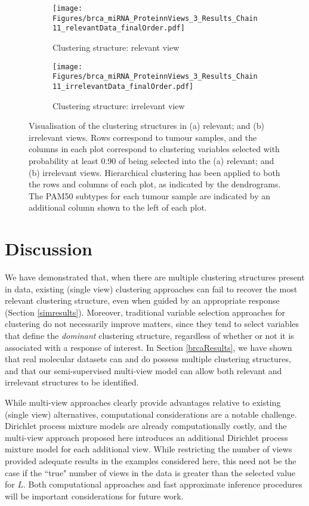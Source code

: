 \documentclass[12pt]{article}
\begin{document}
\begin{figure}[!ht]\centering
    \begin{subfigure}[b]{0.49\textwidth}\centering
\texttt{[image: Figures/brca\_miRNA\_ProteinnViews\_3\_Results\_Chain11\_relevantData\_finalOrder.pdf]}
\caption{Clustering structure: relevant view}
    \end{subfigure}
    \begin{subfigure}[b]{0.49\textwidth}\centering
\texttt{[image: Figures/brca\_miRNA\_ProteinnViews\_3\_Results\_Chain11\_irrelevantData\_finalOrder.pdf]}
\caption{Clustering structure: irrelevant view}
    \end{subfigure}\caption{Visualisation of the clustering structures in (a) relevant; and (b) irrelevant views.  Rows correspond to tumour samples, and the columns in each plot correspond to clustering variables selected with probability at least 0.90 of being selected into the (a) relevant; and (b) irrelevant views.  Hierarchical clustering has been applied to both the rows and columns of each plot, as indicated by the dendrograms.  The PAM50 subtypes for each tumour sample are indicated by an additional column shown to the left of each plot.  }\label{mv}
\end{figure}

\section{Discussion}
We have demonstrated that, when there are multiple clustering structures present in data, existing (single view) clustering approaches can fail to recover the most relevant clustering structure, even when guided by an appropriate response (Section \ref{simresults}).  Moreover, traditional variable selection approaches for clustering do not necessarily improve matters, since they tend to select variables that define the {\em dominant} clustering structure, regardless of whether or not it is associated with a response of interest.  In Section \ref{brcaResults}, we have shown that real molecular datasets can and do possess multiple clustering structures, and that our semi-supervised multi-view model can allow both relevant and irrelevant structures to be identified.

While multi-view approaches clearly provide advantages relative to existing (single view) alternatives, computational considerations are a notable challenge.  Dirichlet process mixture models are already computationally costly, and the multi-view approach proposed here introduces an additional Dirichlet process mixture model for each additional view.  While restricting the number of views provided adequate results in the examples considered here, this need not be the case if the ``true" number of views in the data is greater than the selected value for $L$.  Both computational approaches \citep[such as parallelisation, as in][]{Suchard2010} and fast approximate inference procedures \citep[such as variational Bayes, as in][]{Guan2010} will be important considerations for future work.  %
\end{document}
